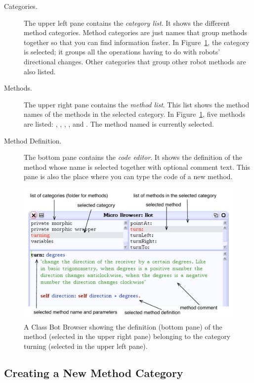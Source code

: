 \documentclass[a4paper,10pt,twoside]{book}
\begin{document}
\begin{description}
	\item[Categories.] The upper left pane contains the \emph{category list}. It shows the different method 
categories. Method categories are just names that group methods together so that you 
can find information faster. In Figure~\ref{fig:121}, the category  is selected; it groups all 
the operations having to do with robots’ directional changes. Other categories that group 
other robot methods are also listed. 

	\item[Methods.] The upper right pane contains the \emph{method list}. This list shows the method 
names of the methods in the selected category. In Figure~\ref{fig:121}, five methods are listed: 
, , , , and . The method named  is currently selected. 

	\item[Method Definition.] The bottom pane contains the \emph{code editor}. It shows the definition of 
the method whose name is selected together with optional comment text. This pane is 
also the place where you can type the code of a new method. 
\end{description}

\begin{figure}[ht]
	\centerline{\includegraphics[width=0.95\linewidth]{tbOneAnnotated}}
	\caption{A Class Bot Browser showing the definition (bottom pane) of the method  
(selected in the upper right pane) belonging to the category turning (selected in the upper 
left pane). \label{fig:121}}
\end{figure}

\subsection{Creating a New Method Category}
\end{document}
